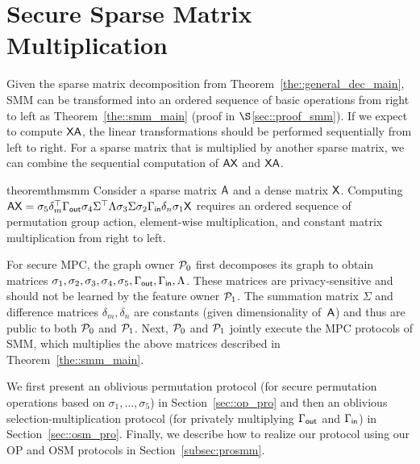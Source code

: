 \section{Secure Sparse Matrix Multiplication}
\label{sec::smm_protocol}
Given the sparse matrix decomposition from Theorem~\ref{the::general_dec_main}, SMM can be %
transformed into an ordered sequence of basic operations from right to left as Theorem~\ref{the::smm_main} (proof in $\S$\ref{sec::proof_smm}).
If we expect to compute $\mathsf{X}\mathsf{A}$, the linear transformations should be performed sequentially from left to right.
For a sparse matrix that is multiplied by another sparse matrix, we can combine the sequential computation of $\mathsf{A}\mathsf{X}$ and $\mathsf{X}\mathsf{A}$.

\begin{restatable}{theorem}{thmsmm}
\label{the::smm_main}
Consider a sparse matrix $\mathsf{A}$ and a dense matrix $\mathsf{X}$.
Computing $\mathsf{A}\mathsf{X} =
\allowbreak \sigma_5 \delta_m ^{\top} \Gamma_{\mathsf{out}} \sigma_4 \Sigma ^{\top} \Lambda \sigma_3\allowbreak \Sigma \sigma_2 \Gamma_{\mathsf{in}} \delta_n \sigma_1 \mathsf{X}$ requires an ordered sequence of permutation group action, element-wise multiplication, %
and constant matrix multiplication from right to left.
\end{restatable}

For secure MPC, the graph owner $\mathcal{P}_0$ first decomposes its graph to obtain matrices $\sigma_1, \sigma_2, \sigma_3, \sigma_4, \sigma_5, \Gamma_{\mathsf{out}}, \Gamma_{\mathsf{in}}, \Lambda$.
These matrices are privacy-sensitive and should not be learned by the feature owner $\mathcal{P}_1$.
The summation matrix $\Sigma$ and difference matrices $\delta_m, \delta_n$ are constants (given dimensionality of~$\mathsf{A}$) and thus are public to both $\mathcal{P}_0$ and $\mathcal{P}_1$.
Next, $\mathcal{P}_0$ and $\mathcal{P}_1$ jointly execute the MPC protocols of SMM, which multiplies the above matrices described in Theorem~\ref{the::smm_main}.

We first present an oblivious permutation protocol (for secure permutation operations based on $\sigma_1, \ldots, \sigma_5$) in Section~\ref{sec::op_pro}
and then an oblivious selection-multiplication protocol (for privately multiplying $\Gamma_{\mathsf{out}}$ and $\Gamma_{\mathsf{in}}$) in Section~\ref{sec::osm_pro}.
Finally, we describe how to realize our \osmm protocol using our OP and OSM protocols in Section~\ref{subsec:prosmm}.
 
